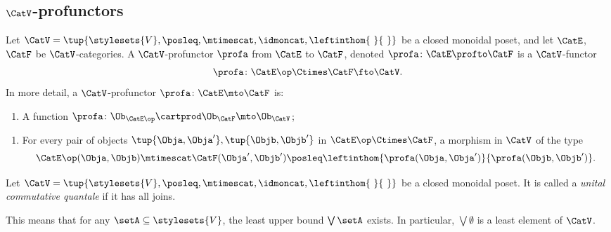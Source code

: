 \subsection{$\CatV$-profunctors}

\begin{ctdefinition}
\label{def:profunctor-monoidal-poset-enriched}
Let $\CatV = \tup{\stylesets{V}, \posleq, \mtimescat, \idmoncat, \leftinthom{\ }{\ }}$ be a closed monoidal poset, and let $\CatE$, $\CatF$ be $\CatV$-categories. A $\CatV$-profunctor $\profa$ from $\CatE$ to $\CatF$, denoted $\profa \colon \CatE \profto \CatF$ is a $\CatV$-functor
\begin{equation}
\profa \colon \CatE\op \Ctimes \CatF \fto \CatV.
\end{equation}
In more detail, a $\CatV$-profunctor $\profa \colon \CatE \mto \CatF$ is:

\constit

\begin{enumerate}
\item A function $\profa \colon \Ob_{\CatE\op} \cartprod \Ob_{\CatF} \mto \Ob_\CatV$;
\end{enumerate}

\condit

\begin{enumerate}
\item For every pair of objects $\tup{\Obja, \Obja'}, \tup{\Objb, \Objb'}$ in $\CatE\op \Ctimes \CatF$, a morphism in $\CatV$ of the type
\begin{equation}
\CatE\op(\Obja, \Objb) \mtimescat \CatF(\Obja', \Objb') \posleq \leftinthom{\profa(\Obja, \Obja')}{\profa(\Objb, \Objb')}.
\end{equation}
\end{enumerate}
\end{ctdefinition}


\begin{ctdefinition}
\label{def:unital-commutative-quantale}
Let $\CatV = \tup{\stylesets{V}, \posleq, \mtimescat, \idmoncat, \leftinthom{\ }{\ }}$ be a closed monoidal poset. It is called a \emph{unital commutative quantale} if it has all joins. 

This means that for any $\setA \subseteq \stylesets{V}$, the least upper bound $\bigvee\setA$ exists. In particular, $\bigvee \emptyset$ is a least element of $\CatV$. 
\end{ctdefinition}

